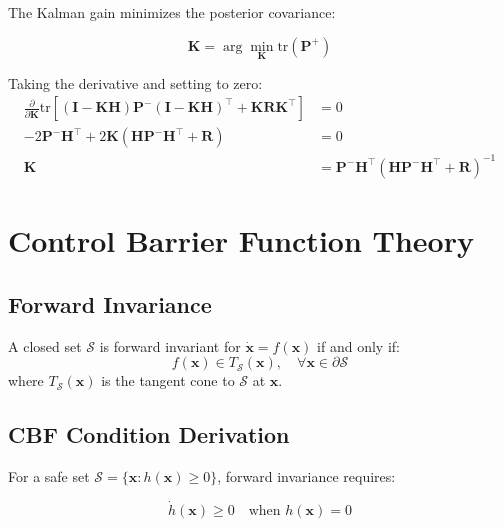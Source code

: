 The Kalman gain minimizes the posterior covariance:

\begin{equation}
    \mathbf{K} = \arg\min_{\mathbf{K}} \text{tr}(\mathbf{P}^+)
\end{equation}

Taking the derivative and setting to zero:
\begin{align}
    \frac{\partial}{\partial \mathbf{K}} \text{tr}\left[(\mathbf{I} - \mathbf{K}\mathbf{H})\mathbf{P}^-(\mathbf{I} - \mathbf{K}\mathbf{H})^\top + \mathbf{K}\mathbf{R}\mathbf{K}^\top\right] &= 0 \\
    -2\mathbf{P}^-\mathbf{H}^\top + 2\mathbf{K}(\mathbf{H}\mathbf{P}^-\mathbf{H}^\top + \mathbf{R}) &= 0 \\
    \mathbf{K} &= \mathbf{P}^-\mathbf{H}^\top(\mathbf{H}\mathbf{P}^-\mathbf{H}^\top + \mathbf{R})^{-1}
\end{align}

\section{Control Barrier Function Theory}

\subsection{Forward Invariance}

\begin{theorem}
A closed set $\mathcal{S}$ is forward invariant for $\dot{\mathbf{x}} = f(\mathbf{x})$ if and only if:
\begin{equation}
    f(\mathbf{x}) \in T_{\mathcal{S}}(\mathbf{x}), \quad \forall \mathbf{x} \in \partial\mathcal{S}
\end{equation}
where $T_{\mathcal{S}}(\mathbf{x})$ is the tangent cone to $\mathcal{S}$ at $\mathbf{x}$.
\end{theorem}

\subsection{CBF Condition Derivation}

For a safe set $\mathcal{S} = \{\mathbf{x} : h(\mathbf{x}) \geq 0\}$, forward invariance requires:

\begin{equation}
    \dot{h}(\mathbf{x}) \geq 0 \quad \text{when } h(\mathbf{x}) = 0
\end{equation}

